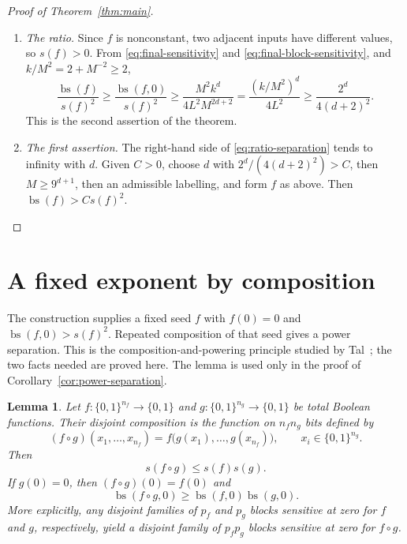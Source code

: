 \documentclass[11pt]{article}
\newcommand{\bs}{\operatorname{bs}}
\newtheorem{lemma}[theorem]{Lemma}
\theoremstyle{definition}
\theoremstyle{remark}
\begin{document}
\begin{proof}[Proof of Theorem~\ref{thm:main}]
\begin{enumerate}[label=\textbf{T\arabic*.},leftmargin=*]
\begin{equation}
 \bs(f,0)\geq M^2k^d.
\end{equation}
\item \emph{The ratio.} Since \(f\) is nonconstant, two adjacent inputs have different values, so \(s(f)>0\). From \eqref{eq:final-sensitivity} and \eqref{eq:final-block-sensitivity}, and \(k/M^2=2+M^{-2}\ge2\),
\begin{equation}
\label{eq:ratio-separation}
 \frac{\bs(f)}{s(f)^2}
 \geq\frac{\bs(f,0)}{s(f)^2}
 \geq\frac{M^2k^d}{4L^2M^{2d+2}}
 =\frac{(k/M^2)^d}{4L^2}
 \geq\frac{2^d}{4(d+2)^2}.
\end{equation}
This is the second assertion of the theorem.
\item \emph{The first assertion.} The right-hand side of \eqref{eq:ratio-separation} tends to infinity with \(d\). Given \(C>0\), choose \(d\) with \(2^d/(4(d+2)^2)>C\), then \(M\ge9^{d+1}\), then an admissible labelling, and form \(f\) as above. Then \(\bs(f)>Cs(f)^2\).\qedhere
\end{enumerate}
\end{proof}

\section{A fixed exponent by composition}
\label{sec:composition}

The construction supplies a fixed seed \(f\) with \(f(0)=0\) and \(\bs(f,0)>s(f)^2\).
Repeated composition of that seed gives a power separation.
This is the composition-and-powering principle studied by Tal~\cite{Tal2013}; the two facts needed are proved here.
The lemma is used only in the proof of Corollary~\ref{cor:power-separation}.

\begin{lemma}
\label{lem:composition}
Let $f:\{0,1\}^{n_f}\to\{0,1\}$ and
$g:\{0,1\}^{n_g}\to\{0,1\}$ be total Boolean functions.
Their disjoint composition is the function on $n_fn_g$ bits defined by
\[
 (f\circ g)(x_1,\ldots,x_{n_f})
   =f\bigl(g(x_1),\ldots,g(x_{n_f})\bigr),
 \qquad x_i\in\{0,1\}^{n_g}.
\]
Then
\[
 s(f\circ g)\leq s(f)s(g).
\]
If $g(0)=0$, then $(f\circ g)(0)=f(0)$ and
\[
 \bs(f\circ g,0)\geq\bs(f,0)\bs(g,0).
\]
More explicitly, any disjoint families of $p_f$ and $p_g$ blocks sensitive at
zero for $f$ and $g$, respectively, yield a disjoint family of $p_fp_g$ blocks
sensitive at zero for $f\circ g$.
\end{lemma}
\end{document}
